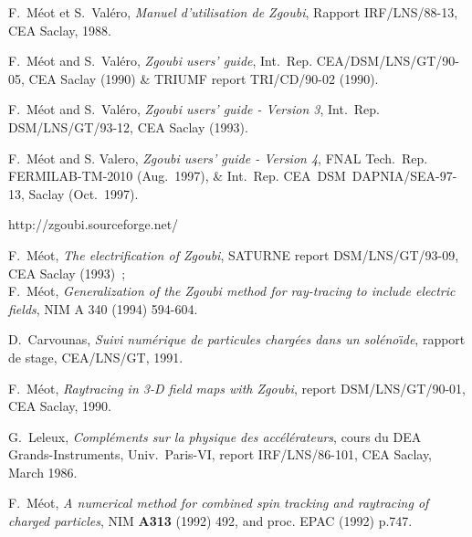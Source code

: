 


\pagestyle{myheadings}

\begin{thebibliography}{99}  %

F.~M\'eot et S.~Val\'ero, 
\textsl{Manuel d'utilisation de  Zgoubi}, 
Rapport IRF/LNS/88-13, CEA Saclay, 1988.  

F.~M\'eot and S.~Val\'ero, 
\textsl{Zgoubi users' guide}, 
Int.~Rep. CEA/DSM/LNS/GT/90-05, CEA Saclay (1990) \& TRIUMF report TRI/CD/90-02 (1990). 

F.~M\'eot and S.~Val\'ero, 
\textsl{Zgoubi users' guide - Version 3}, 
Int.~Rep. DSM/LNS/GT/93-12, CEA Saclay (1993). 

F.~M\'eot and S. Valero,  
\textsl{Zgoubi users' guide - Version 4}, 
FNAL Tech.~Rep. FERMILAB-TM-2010 (Aug.~1997),  \& 
Int.~Rep. CEA~DSM~DAPNIA/SEA-97-13, Saclay (Oct.~1997). 

 http://zgoubi.sourceforge.net/ 

F.~M\'eot, 
\textsl{The electrification of Zgoubi}, 
SATURNE report DSM/LNS/GT/93-09, CEA Saclay (1993)~; \\
F.~M\'eot, 
\textsl{Generalization of the Zgoubi method for ray-tracing to include electric fields}, 
NIM A 340 (1994) 594-604. 

D.~Carvounas, 
\textsl{Suivi num\'erique de particules charg\'ees dans un sol\'eno\"\i de}, 
rapport de stage, CEA/LNS/GT, 1991. 

F.~M\'eot, 
\textsl{Raytracing in 3-D field maps with Zgoubi}, 
report  DSM/LNS/GT/90-01, CEA Saclay, 1990.

G.~Leleux, 
\textsl{Compl\'ements sur la physique des acc\'el\'erateurs}, 
cours du DEA Grands-Instruments, Univ.~Paris-VI,  report  IRF/LNS/86-101, CEA Saclay, March 1986. 

F.~M\'eot, 
\textsl{A numerical method for combined spin tracking and raytracing of charged particles}, 
NIM \textbf{A313} (1992) 492, and proc. EPAC (1992) p.747. 


\end{thebibliography}
